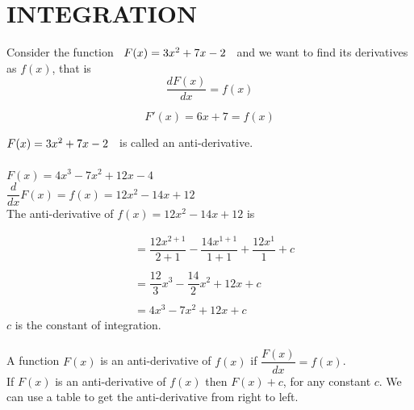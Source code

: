 \documentclass[11pt,a4paper]{article}
\begin{document}
\pagebreak
\section{INTEGRATION}

Consider the function $\hspace{0.2cm} F(x) = 3x^2 + 7x - 2\hspace{0.2cm}$ and we want to find its derivatives as $f(x)$, that is $$\dfrac{d F(x)}{dx} = f(x)$$

$$F'(x) = 6x + 7 = f(x)$$

$F(x) = 3x^2 + 7x - 2\hspace{0.2cm}$ is called an anti-derivative.\\\\


$F(x) = 4x^3 - 7x^2 + 12x - 4$\\

$\dfrac{d}{dx}F(x) = f(x) = 12x^2 - 14x + 12$\\


The anti-derivative of $f(x) = 12x^2 - 14x + 12$ is 

\begin{align*}
&  = \dfrac{12 x^{2+1}}{2 + 1} - \dfrac{14x^{1+1}}{1 + 1} + \dfrac{12 x^1}{1}  + c\\\\
& = \dfrac{12}{3}x^3 - \dfrac{14}{2}x^2 + 12x + c\\\\
& = 4x^3 - 7x^2 + 12x + c
\end{align*}
$c$ is the constant of integration.\\\\









A function $F(x)$ is an anti-derivative of $f(x)$ if $\dfrac{F(x)}{dx} = f(x)$.\\

If $F(x)$ is an anti-derivative of $f(x)$ then $F(x) + c$, for any constant $c$. We can use a table to get the anti-derivative from right to left.\\
\end{document}
